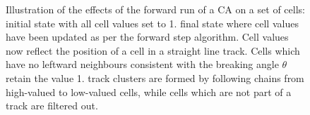 \begin{figure}
\centering
{}

\caption[Initial and final states of a CA for track finding]{\label{fig:cellularautomaton_run}Illustration of the effects of the forward run of a \ac{CA} on a set of cells:\newline {} initial state with all cell values set to 1.  final state where cell values have been updated as per the forward step algorithm. Cell values now reflect the position of a cell in a straight line track. Cells which have no leftward neighbours consistent with the breaking angle $\theta$ retain the value 1.  track clusters are formed by following chains from high-valued to low-valued cells, while cells which are not part of a track are filtered out.}
\end{figure}

